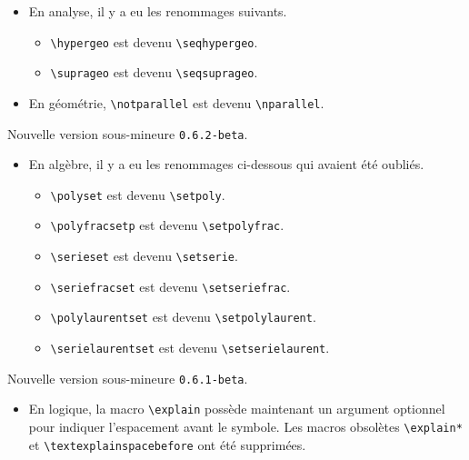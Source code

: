 \documentclass[12pt,a4paper]{article}
\begin{document}
\begin{description}[leftmargin=1em]
\begin{itemize}
        \item En analyse, il y a eu les renommages suivants.
        \begin{itemize}
        	\item \verb+\hypergeo+ est devenu \verb+\seqhypergeo+.

        	\item \verb+\suprageo+ est devenu \verb+\seqsuprageo+.
        \end{itemize}

        \item En géométrie, \verb+\notparallel+ est devenu \verb+\nparallel+.
    \end{itemize}



    \item[2019-10-14] Nouvelle version sous-mineure \verb+0.6.2-beta+.
    \begin{itemize}
        \item En algèbre, il y a eu les renommages ci-dessous qui avaient été oubliés.
        \begin{itemize}
        	\item \verb+\polyset+ est devenu \verb+\setpoly+.

        	\item \verb+\polyfracsetp+ est devenu \verb+\setpolyfrac+.

        	\item \verb+\serieset+ est devenu \verb+\setserie+.

        	\item \verb+\seriefracset+ est devenu \verb+\setseriefrac+.

        	\item \verb+\polylaurentset+ est devenu \verb+\setpolylaurent+.

        	\item \verb+\serielaurentset+ est devenu \verb+\setserielaurent+.
        \end{itemize}
    \end{itemize} 



    \item[2019-10-13] Nouvelle version sous-mineure \verb+0.6.1-beta+.
    \begin{itemize}
        \item En logique, la macro \verb+\explain+ possède maintenant un argument optionnel pour indiquer l'espacement avant le symbole. Les macros obsolètes \verb+\explain*+ et \verb+\textexplainspacebefore+ ont été supprimées.


\end{itemize}
\end{description}
\end{document}
